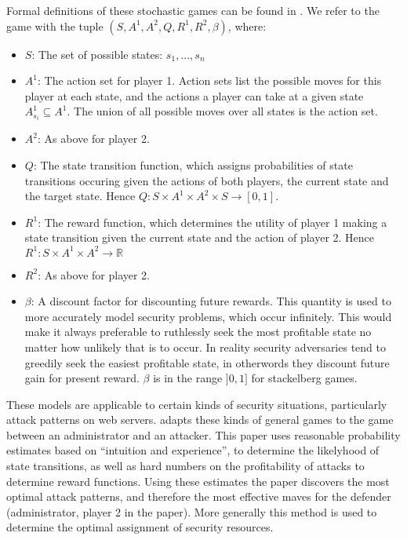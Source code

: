 \documentclass{article}
\begin{document}
Formal definitions of these stochastic games can be found in \cite{network}.
We refer to the game with the tuple $(S, A^1, A^2, Q, R^1, R^2, \beta)$, where:
\begin{itemize}
	\item $S$: The set of possible states: ${s_1, ..., s_n}$
	\item $A^1$: The action set for player 1.
			Action sets list the possible moves for this player at each state, and the actions a player can take at a given state $A^1_{s_i} \subseteq A^1$.
			The union of all possible moves over all states is the action set.			
	\item $A^2$: As above for player 2.
	\item $Q$: The state transition function, which assigns probabilities of state transitions occuring given the actions of both players, the current state and the target state.
				Hence $Q: S \times A^1 \times A^2 \times S \rightarrow [0, 1]$.
	\item $R^1$: The reward function, which determines the utility of player 1 making a state transition given the current state and the action of player 2.
				Hence $R^1: S \times A^1 \times A^2 \rightarrow \mathbb{R}$
	\item $R^2$: As above for player 2.
	\item $\beta$: A discount factor for discounting future rewards.
			This quantity is used to more accurately model security problems, which occur infinitely.
			This would make it always preferable to ruthlessly seek the most profitable state no matter how unlikely that is to occur.
			In reality security adversaries tend to greedily seek the easiest profitable state, in otherwords they discount future gain for present reward.
			$\beta$ is in the range $]0, 1]$ for stackelberg games.
\end{itemize}

These models are applicable to certain kinds of security situations, particularly attack patterns on web servers.
\cite{network} adapts these kinds of general games to the game between an administrator and an attacker.
This paper uses reasonable probability estimates based on ``intuition and experience'', to determine the likelyhood of state transitions, as well as hard numbers on the profitability of attacks to determine reward functions.
Using these estimates the paper discovers the most optimal attack patterns, and therefore the most effective maves for the defender (administrator, player 2 in the paper).
More generally this method is used to determine the optimal assignment of security resources.
\end{document}
